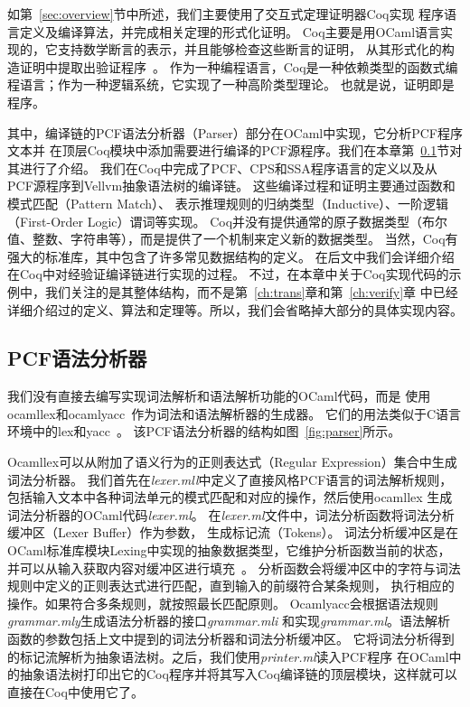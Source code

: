 如第~\ref{sec:overview}节中所述，我们主要使用了交互式定理证明器Coq实现
程序语言定义及编译算法，并完成相关定理的形式化证明。
Coq主要是用OCaml语言实现的，它支持数学断言的表示，并且能够检查这些断言的证明，
从其形式化的构造证明中提取出验证程序~\cite{paulin2011introduction}。
作为一种编程语言，Coq是一种依赖类型的函数式编程语言；作为一种逻辑系统，它实现了一种高阶类型理论。
也就是说，证明即是程序。

其中，编译链的PCF语法分析器（Parser）部分在OCaml中实现，它分析PCF程序文本并
在顶层Coq模块中添加需要进行编译的PCF源程序。我们在本章第~\ref{sec:pcfparser}节对其进行了介绍。
我们在Coq中完成了PCF、CPS和SSA程序语言的定义以及从PCF源程序到Vellvm抽象语法树的编译链。
这些编译过程和证明主要通过函数和模式匹配（Pattern Match）、
表示推理规则的归纳类型（Inductive）、一阶逻辑（First-Order Logic）谓词等实现。
Coq并没有提供通常的原子数据类型（布尔值、整数、字符串等），而是提供了一个机制来定义新的数据类型。
当然，Coq有强大的标准库，其中包含了许多常见数据结构的定义。
在后文中我们会详细介绍在Coq中对经验证编译链进行实现的过程。
不过，在本章中关于Coq实现代码的示例中，我们关注的是其整体结构，而不是第~\ref{ch:trans}章和第~\ref{ch:verify}章
中已经详细介绍过的定义、算法和定理等。所以，我们会省略掉大部分的具体实现内容。

\subsection{PCF语法分析器} \label{sec:pcfparser}
我们没有直接去编写实现词法解析和语法解析功能的OCaml代码，而是
使用ocamllex和ocamlyacc~\cite{smith2007ocamllex}作为词法和语法解析器的生成器。
它们的用法类似于C语言环境中的lex和yacc~\cite{levine1992lex}。
该PCF语法分析器的结构如图~\ref{fig:parser}所示。

Ocamllex可以从附加了语义行为的正则表达式（Regular Expression）集合中生成词法分析器。
我们首先在\textit{lexer.mll}中定义了直接风格PCF语言的词法解析规则，
包括输入文本中各种词法单元的模式匹配和对应的操作，然后使用ocamllex
生成词法分析器的OCaml代码\textit{lexer.ml}。
在\textit{lexer.ml}文件中，词法分析函数将词法分析缓冲区（Lexer Buffer）作为参数，
生成标记流（Tokens）。
词法分析缓冲区是在OCaml标准库模块Lexing中实现的抽象数据类型，它维护分析函数当前的状态，
并可以从输入获取内容对缓冲区进行填充~\cite{leroy2021ocaml}。
分析函数会将缓冲区中的字符与词法规则中定义的正则表达式进行匹配，直到输入的前缀符合某条规则，
执行相应的操作。如果符合多条规则，就按照最长匹配原则。
Ocamlyacc会根据语法规则\textit{grammar.mly}生成语法分析器的接口\textit{grammar.mli}
和实现\textit{grammar.ml}。语法解析函数的参数包括上文中提到的词法分析器和词法分析缓冲区。
它将词法分析得到的标记流解析为抽象语法树。之后，我们使用\textit{printer.ml}读入PCF程序
在OCaml中的抽象语法树打印出它的Coq程序并将其写入Coq编译链的顶层模块，这样就可以直接在Coq中使用它了。

